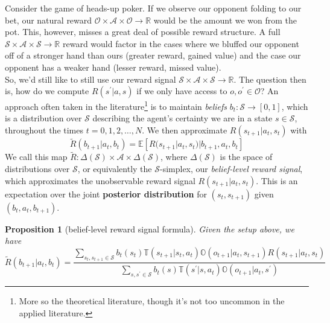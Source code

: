 \documentclass[12pt]{article}
\newtheorem{proposition}{Proposition}
\begin{document}
Consider the game of heads-up poker. If we observe our opponent folding to our bet, our natural reward $\mathcal{O} \times 
\mathcal{A} \times \mathcal{O} \to \mathbb{R}$ would be the amount we won from the pot. This, however, misses a great deal 
of possible reward structure. A full $\mathcal{S} \times \mathcal{A} \times \mathcal{S} \to \mathbb{R}$ reward would factor in 
the cases where we bluffed our opponent off of a stronger hand than ours (greater reward, gained value) and the case our 
opponent has a weaker hand (lesser reward, missed value). \\ 

So, we'd still like to still use our reward signal $\mathcal{S} \times \mathcal{A} \times \mathcal{S} \to \mathbb{R}$. The question 
then is, how do we compute $R(s^\prime | a, s)$ if we only have access to $o, o^\prime \in \mathcal{O}$? An approach often
taken in the literature\footnote{
    More so the theoretical literature, though it's not too uncommon in the applied literature.
} is to maintain \textit{beliefs} $b_t: \mathcal{S} \to [0,1]$, which is a distribution over $\mathcal{S}$ describing the 
agent's certainty we are in a state $s \in \mathcal{S}$, throughout the times $t = 0, 1, 2, \dots, N$. We then approximate 
$R(s_{t+1} | a_t, s_t)$ with 
$$
\tilde{R}(b_{t+1} | a_t, b_t) = \mathbb{E}[R(s_{t+1} | a_t, s_t) | b_{t+1}, a_t, b_t] 
$$
We call this map $\tilde{R}: \Delta(\mathcal{S}) \times \mathcal{A} \times \Delta(\mathcal{S})$, where $\Delta(\mathcal{S})$ is 
the space of distributions over $\mathcal{S}$, or equivalently the $\mathcal{S}$-simplex, our \textit{belief-level reward signal}, 
which approximates the unobservable reward signal $R(s_{t+1} | a_t, s_t)$. This is an expectation over the joint \textbf{posterior 
distribution} for $(s_t, s_{t+1})$ given $(b_t, a_t, b_{t+1})$. 

\begin{proposition}[belief-level reward signal formula]
    Given the setup above, we have 
    $$
    \tilde{R}(b_{t+1} | a_t, b_t) = \frac
    {\sum_{s_t, s_{t+1} \in \mathcal{S}} b_t(s_t) \mathbb{T}(s_{t+1} | s_t, a_t) \mathbb{O}(o_{t+1} | a_t, s_{t+1}) R(s_{t+1} | a_t, s_t)}
    {\sum_{s, s^\prime \in \mathcal{S}} b_t(s) \mathbb{T}(s^\prime | s, a_t) \mathbb{O}(o_{t+1} | a_t, s^\prime)} 
    $$
\end{proposition}
\end{document}
